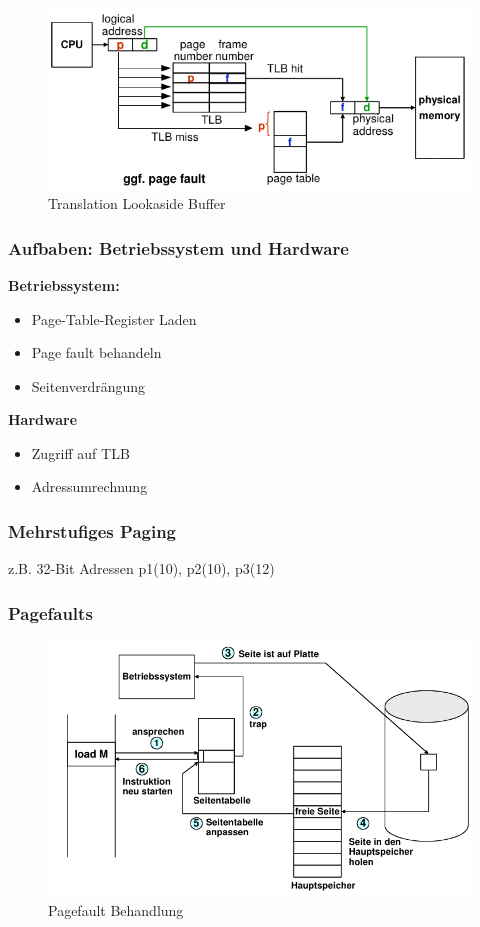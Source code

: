 \begin{figure}[ht!]
    \includegraphics[scale=.5]{pics/tlb}
    \caption{Translation Lookaside Buffer}
\end{figure}

\subsubsection{Aufbaben: Betriebssystem und Hardware}

\textbf{Betriebssystem:}
\begin{itemize}
    \item Page-Table-Register Laden
    \item Page fault behandeln
    \item Seitenverdrängung
\end{itemize}

\noindent\textbf{Hardware}
\begin{itemize}
    \item Zugriff auf TLB
    \item Adressumrechnung
\end{itemize}

\subsubsection{Mehrstufiges Paging}
z.B. 32-Bit Adressen p1(10), p2(10), p3(12)

\pagebreak

\subsubsection{Pagefaults}
\begin{figure}[ht!]
    \includegraphics[scale=.4]{pics/pagefault}
    \caption{Pagefault Behandlung}
\end{figure}

